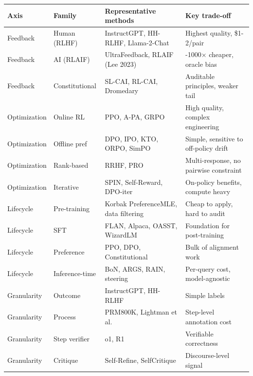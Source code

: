 {\def\LTcaptype{none} %
\begin{longtable}[]{@{}
  >{\raggedright\arraybackslash}p{}
  >{\raggedright\arraybackslash}p{}
  >{\raggedright\arraybackslash}p{}
  >{\raggedright\arraybackslash}p{}@{}}
\toprule\noalign{}
\begin{minipage}[b]{\linewidth}\raggedright
Axis
\end{minipage} & \begin{minipage}[b]{\linewidth}\raggedright
Family
\end{minipage} & \begin{minipage}[b]{\linewidth}\raggedright
Representative methods
\end{minipage} & \begin{minipage}[b]{\linewidth}\raggedright
Key trade-off
\end{minipage} \\
\midrule\noalign{}
\endhead
\bottomrule\noalign{}
\endlastfoot
Feedback & Human (RLHF) & InstructGPT, HH-RLHF, Llama-2-Chat & Highest quality, \$1-2/pair \\
Feedback & AI (RLAIF) & UltraFeedback, RLAIF (Lee 2023) & 100-1000× cheaper, oracle bias \\
Feedback & Constitutional & SL-CAI, RL-CAI, Dromedary & Auditable principles, weaker tail \\
Optimization & Online RL & PPO, A-PA, GRPO & High quality, complex engineering \\
Optimization & Offline pref & DPO, IPO, KTO, ORPO, SimPO & Simple, sensitive to off-policy drift \\
Optimization & Rank-based & RRHF, PRO & Multi-response, no pairwise constraint \\
Optimization & Iterative & SPIN, Self-Reward, DPO-iter & On-policy benefits, compute heavy \\
Lifecycle & Pre-training & Korbak PreferenceMLE, data filtering & Cheap to apply, hard to audit \\
Lifecycle & SFT & FLAN, Alpaca, OASST, WizardLM & Foundation for post-training \\
Lifecycle & Preference & PPO, DPO, Constitutional & Bulk of alignment work \\
Lifecycle & Inference-time & BoN, ARGS, RAIN, steering & Per-query cost, model-agnostic \\
Granularity & Outcome & InstructGPT, HH-RLHF & Simple labels \\
Granularity & Process & PRM800K, Lightman et al. & Step-level annotation cost \\
Granularity & Step verifier & o1, R1 & Verifiable correctness \\
Granularity & Critique & Self-Refine, SelfCritique & Discourse-level signal \\
\end{longtable}
}

